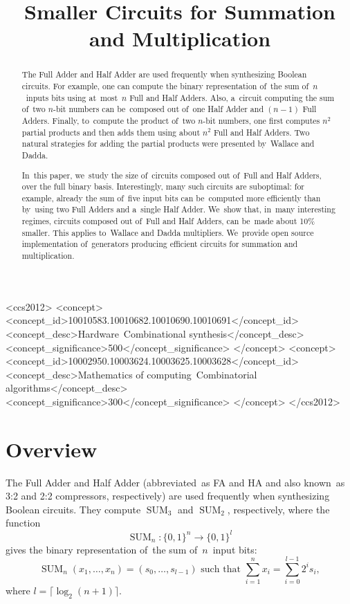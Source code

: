 \documentclass[sigconf, review, anonymous]{acmart}
\DeclareMathOperator{\SUM}{SUM}
\begin{document}
\begin{CCSXML}
	<ccs2012>
	<concept>
	<concept_id>10010583.10010682.10010690.10010691</concept_id>
	<concept_desc>Hardware~Combinational synthesis</concept_desc>
	<concept_significance>500</concept_significance>
	</concept>
	<concept>
	<concept_id>10002950.10003624.10003625.10003628</concept_id>
	<concept_desc>Mathematics of computing~Combinatorial algorithms</concept_desc>
	<concept_significance>300</concept_significance>
	</concept>
	</ccs2012>
\end{CCSXML}



\title{Smaller Circuits for Summation and Multiplication}




\begin{abstract}
	The Full Adder and Half Adder are used frequently when synthesizing Boolean circuits.
	For example, one can compute the binary representation of~the sum of~$n$~inputs bits
	using at~most~$n$ Full and Half Adders. Also, a~circuit computing the sum of~two $n$-bit
	numbers can be~composed out of~one Half Adder and $(n-1)$ Full Adders. Finally,
	to~compute the product of~two $n$-bit numbers, one first computes $n^2$ partial products
	and then adds them using about $n^2$ Full and Half Adders. Two natural strategies for
	adding the partial products were presented by~Wallace and Dadda.

	In~this paper, we~study the size of~circuits composed out of~Full and Half Adders,
	over the full binary basis. Interestingly, many such circuits are suboptimal:
	for example, already the sum of~five input bits can be~computed more efficiently
	than by~using two Full Adders and a~single Half Adder. We~show that, in~many interesting
	regimes, circuits composed out of~Full and Half Adders, can be~made about 10\% smaller.
	This applies to~Wallace and Dadda multipliers.
	We~provide open source implementation of~generators producing efficient
	circuits for summation and multiplication.
\end{abstract}


\maketitle

\section{Overview}
The Full Adder and Half Adder
(abbreviated~as FA and HA and also known~as 3:2 and 2:2 compressors, respectively)
are used frequently when synthesizing Boolean circuits. They compute $\SUM_3$
and $\SUM_2$, respectively, where the function
\[\SUM_n \colon \{0,1\}^n \to \{0,1\}^l\]
gives the binary representation of~the sum of~$n$~input bits:
\[\SUM_n(x_1, \dotsc, x_n)=(s_0, \dotsc, s_{l-1}) \text{ such that } \sum_{i=1}^{n}x_i=\sum_{i=0}^{l-1}2^is_i,\]
where $l=\lceil \log_2(n+1) \rceil$.
\end{document}
